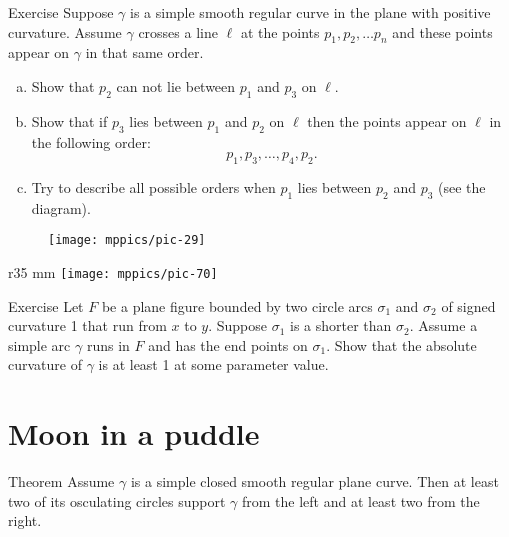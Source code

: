 \begin{thm}{Exercise}\label{ex:line-curve-intersections}
Suppose $\gamma$ is a simple smooth regular curve in the plane with positive curvature.
Assume $\gamma$ crosses a line $\ell$ at the points $p_1,p_2,\dots p_n$ and these points appear on $\gamma$ in that same order.
\begin{enumerate}[(a)]

\item\label{ex:line-curve-intersections:a} Show that $p_2$ can not lie between $p_1$ and $p_3$ on $\ell$.

\item\label{ex:line-curve-intersections:b} Show that if $p_3$ lies between $p_1$ and $p_2$ on $\ell$ then the points appear on $\ell$ in the following order:  
\[p_1,p_3,\dots,p_4 ,p_2.\]

\item Try to describe all possible orders when $p_1$ lies between $p_2$ and $p_3$ (see the diagram).

\end{enumerate}
\end{thm}

\begin{figure}[h!]
\vskip-0mm
\centering
\texttt{[image: mppics/pic-29]}
\vskip0mm
\end{figure}

{

\begin{wrapfigure}{r}{35 mm}
\vskip-4mm
\centering
\texttt{[image: mppics/pic-70]}
\vskip0mm
\end{wrapfigure}

\begin{thm}{Exercise}
Let $F$ be a plane figure bounded by two circle arcs $\sigma_1$ and $\sigma_2$ of signed curvature 1 that run from $x$ to $y$.
Suppose $\sigma_1$ is a shorter than $\sigma_2$.
Assume a simple arc $\gamma$ runs in $F$ and has the end points on $\sigma_1$.
Show that the absolute curvature of $\gamma$ is at least 1 at some parameter value.

\end{thm}

}

\section*{Moon in a puddle}

\begin{thm}{Theorem}\label{thm:moon}
Assume $\gamma$ is a simple closed smooth regular plane curve.
Then at least two of its osculating circles support $\gamma$ from the left and  at least two from the right.
\end{thm}

